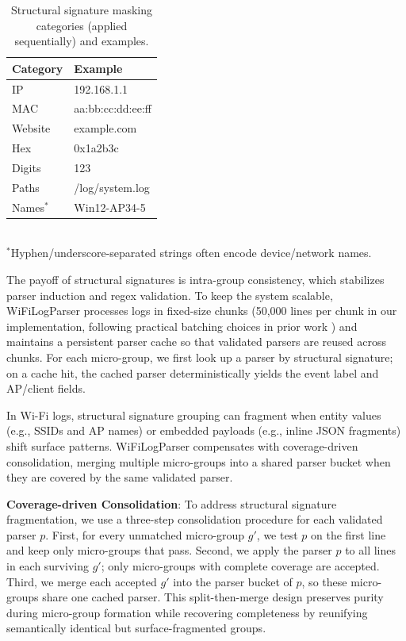 \documentclass[journal]{IEEEtran}
\begin{document}
\begin{table}[!t]
	\centering
	\caption{Structural signature masking categories (applied sequentially) and examples.}
	\label{tab:skeleton_rules}
	\begin{tabular}{@{}ll@{}}
		\toprule
		\textbf{Category} & \textbf{Example}  \\
		\midrule
		IP                & 192.168.1.1       \\
		MAC               & aa:bb:cc:dd:ee:ff \\
		Website           & example.com       \\
		Hex               & 0x1a2b3c          \\
		Digits            & 123               \\
		Paths             & /log/system.log   \\
		Names$^*$         & Win12-AP34-5      \\
		\bottomrule
	\end{tabular}
	\\[0.2em]
	\footnotesize{$^*$Hyphen/underscore-separated strings often encode device/network names.}
\end{table}

The payoff of structural signatures is intra-group consistency, which stabilizes parser induction and regex validation. To keep the system scalable, WiFiLogParser processes logs in fixed-size chunks (50,000 lines per chunk in our implementation, following practical batching choices in prior work \cite{ref32}) and maintains a persistent parser cache so that validated parsers are reused across chunks. For each micro-group, we first look up a parser by structural signature; on a cache hit, the cached parser deterministically yields the event label and AP/client fields.

In Wi-Fi logs, structural signature grouping can fragment when entity values (e.g., SSIDs and AP names) or embedded payloads (e.g., inline JSON fragments) shift surface patterns. WiFiLogParser compensates with coverage-driven consolidation, merging multiple micro-groups into a shared parser bucket when they are covered by the same validated parser.

\textbf{Coverage-driven Consolidation}:
To address structural signature fragmentation, we use a three-step consolidation procedure for each validated parser \(p\). First, for every unmatched micro-group \(g'\), we test \(p\) on the first line and keep only micro-groups that pass. Second, we apply the parser \(p\) to all lines in each surviving \(g'\); only micro-groups with complete coverage are accepted. Third, we merge each accepted \(g'\) into the parser bucket of \(p\), so these micro-groups share one cached parser. This split-then-merge design preserves purity during micro-group formation while recovering completeness by reunifying semantically identical but surface-fragmented groups.
\end{document}
